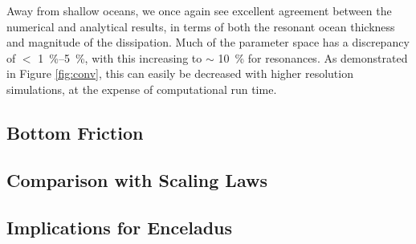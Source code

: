 Away from shallow oceans, we once again see excellent agreement between the numerical and analytical results, in terms of both the resonant ocean thickness and magnitude of the dissipation. Much of the parameter space has a discrepancy of $<$ \SIrange{1}{5}{\percent}, with this increasing to $\sim$ \SI{10}{\percent} for resonances. As demonstrated in Figure \ref{fig:conv}, this can easily be decreased with higher resolution simulations, at the expense of computational run time.


\subsection{Bottom Friction}

\subsection{Comparison with Scaling Laws}

\subsection{Implications for Enceladus}